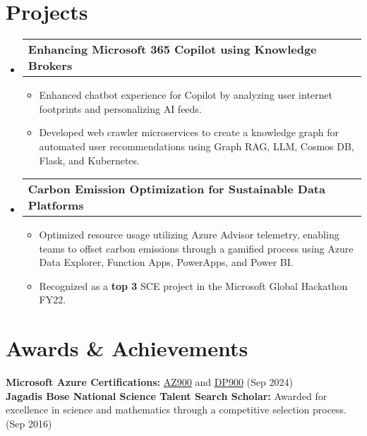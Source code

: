 \documentclass[letterpaper,10pt]{article}
\makeatletter
\newcommand{\resumeItem}[1]{
  \item\small{
    {#1 \vspace{-2pt}}
  }
}
\newcommand{\resumeProjectHeading}[2]{
    \vspace{-2pt}\item
    \begin{tabular*}{0.97\textwidth}{l@{\extracolsep{\fill}}r}
      \small#1 & #2 \\
    \end{tabular*}\vspace{-7pt}
}
\newcommand{\resumeSubHeadingListStart}{\begin{itemize}[leftmargin=0.15in, label={}]}
\newcommand{\resumeSubHeadingListEnd}{\end{itemize}}
\newcommand{\resumeItemListStart}{\begin{itemize}}
\newcommand{\resumeItemListEnd}{\end{itemize}\vspace{-5pt}}
\makeatother
\begin{document}
\section{Projects}
    \vspace{3pt}
    \resumeSubHeadingListStart
    
    \resumeProjectHeading
    {\textbf{Enhancing Microsoft 365 Copilot using Knowledge Brokers}}{}
      \resumeItemListStart
        \resumeItem{Enhanced chatbot experience for Copilot by analyzing user internet footprints and personalizing AI feeds.}
        \resumeItem{Developed web crawler microservices to create a knowledge graph for automated user recommendations using Graph RAG, LLM, Cosmos DB, Flask, and Kubernetes.}
      \resumeItemListEnd

    \resumeProjectHeading
    {\textbf{Carbon Emission Optimization for Sustainable Data Platforms}}{}
      \resumeItemListStart
        \resumeItem{Optimized resource usage utilizing Azure Advisor telemetry, enabling teams to offset carbon emissions through a gamified process using Azure Data Explorer, Function Apps, PowerApps, and Power BI.}
        \resumeItem{Recognized as a \textbf{top 3} SCE project in the Microsoft Global Hackathon FY22.}
      \resumeItemListEnd

    \resumeSubHeadingListEnd



\section{Awards \& Achievements}
  \vspace{2pt}
  \resumeSubHeadingListStart
    \small{\item{
      \textbf{Microsoft Azure Certifications:}{ \href{https://learn.microsoft.com/en-us/users/pritampathak-2523/credentials/c51d4b2c65cc60b4}{\color{blue}AZ900} and \href{https://learn.microsoft.com/en-us/users/pritampathak-2523/credentials/a2b277b3db97103f}{\color{blue}DP900} (Sep 2024)} \\ \vspace{3pt}
        \textbf{Jagadis Bose National Science Talent Search Scholar:}{ Awarded for excellence in science and mathematics through a competitive selection process. (Sep 2016)}
     }}
  \resumeSubHeadingListEnd
\end{document}
